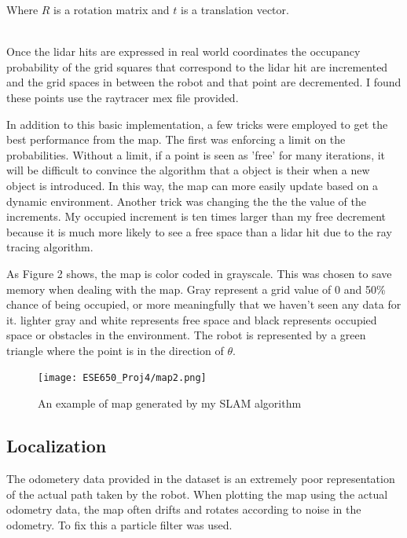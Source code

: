 \documentclass{article}
\begin{document}
Where $R$ is a rotation matrix and $t$ is a translation vector. 
\\
\\
\par
Once the lidar hits are expressed in real world coordinates the occupancy probability of the grid squares that correspond to the lidar hit are incremented and the grid spaces in between the robot and that point are decremented. I found these points use the raytracer mex file provided. 
\par
In addition to this basic implementation, a few tricks were employed to get the best performance from the map. The first was enforcing a limit on the probabilities. Without a limit, if a point is seen as 'free' for many iterations, it will be difficult to convince the algorithm that a object is their when a new object is introduced. In this way, the map can more easily update based on a dynamic environment. Another trick was changing the the the value of the increments. My occupied increment is ten times larger than my free decrement because it is much more likely to see a free space than a lidar hit due to the ray tracing algorithm. 
\par
As Figure 2 shows, the map is color coded in grayscale. This was chosen to save memory when dealing with the map. Gray represent a grid value of 0 and 50\% chance of being occupied, or more meaningfully that we haven't seen any data for it. lighter gray and white represents free space and black represents occupied space or obstacles in the environment. The robot is represented by a green triangle where the point is in the direction of $\theta$.

\FloatBarrier

\begin{figure}[!h]
\texttt{[image: ESE650\_Proj4/map2.png]}
\centering
\caption{An example of map generated by my SLAM algorithm}
\end{figure}

\FloatBarrier

\subsection{Localization}
\par
The odometery data provided in the dataset is an extremely poor representation of the actual path taken by the robot. When plotting the map using the actual odometry data, the map often drifts and rotates according to noise in the odometry. To fix this a particle filter was used.
\end{document}
